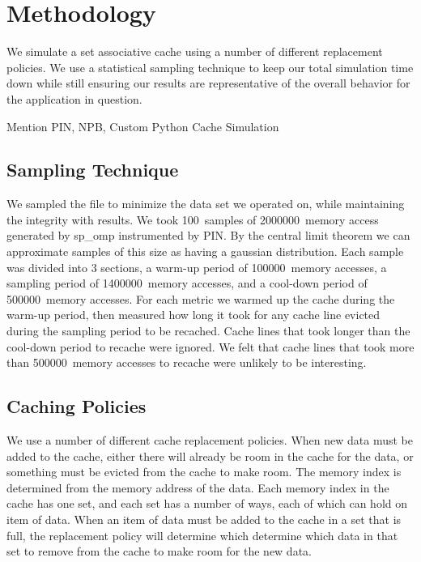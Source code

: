 \newcommand{\SAMPN}{100}
\newcommand{\SAMPK}{2000000}
\newcommand{\SAMP}{1400000}
\newcommand{\WARM}{100000}
\newcommand{\COOL}{500000}

\section{Methodology}
We simulate a set associative cache using a number of different
replacement policies.
We use a statistical sampling technique to keep our total simulation
time down while still ensuring our results are representative of the
overall behavior for the application in question.

Mention PIN, NPB, Custom Python Cache Simulation

\subsection{Sampling Technique}
We sampled the file to minimize the data set we operated on, while maintaining the integrity with results.
	We took \SAMPN~samples of \SAMPK~memory access generated by sp\_omp instrumented by PIN.
	By the central limit theorem we can approximate samples of this size as having a gaussian distribution.
	Each sample was divided into 3 sections, a warm-up period of \WARM~memory accesses,
		a sampling period of \SAMP~memory accesses, and a cool-down period of \COOL~memory accesses.
	For each metric we warmed up the cache during the warm-up period,
		then measured how long it took for any cache line evicted during the sampling period to be recached.
	Cache lines that took longer than the cool-down period to recache were ignored.
	We felt that cache lines that took more than \COOL~memory accesses to recache were unlikely to be interesting.

\subsection{Caching Policies}
\label{sec:policies}

We use a number of different cache replacement policies.  When new data must be added to the cache, either there will already be room in the cache for the data, or something must be evicted from the cache to make room.  The memory index is determined from the memory address of the data.  Each memory index in the cache has one set, and each set has a number of ways, each of which can hold on item of data.  When an item of data must be added to the cache in a set that is full, the replacement policy will determine which determine which data in that set to remove from the cache to make room for the new data.

